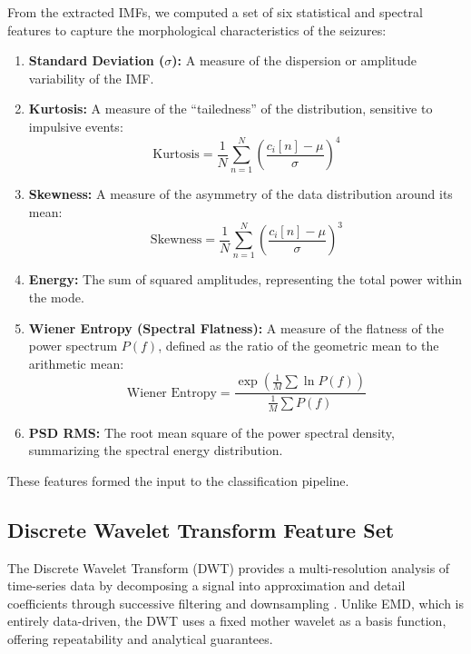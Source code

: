 \documentclass[pdflatex,sn-mathphys-num]{sn-jnl}%
\theoremstyle{thmstyleone}%
\theoremstyle{thmstyletwo}%
\theoremstyle{thmstylethree}%
\begin{document}
From the extracted IMFs, we computed a set of six statistical and spectral features to capture the morphological characteristics of the seizures:

\begin{enumerate}
    \item \textbf{Standard Deviation ($\sigma$):} A measure of the dispersion or amplitude variability of the IMF.
    \item \textbf{Kurtosis:} A measure of the ``tailedness'' of the distribution, sensitive to impulsive events:
    \begin{equation}
        \text{Kurtosis} = \frac{1}{N} \sum_{n=1}^{N} \left( \frac{c_i[n] - \mu}{\sigma} \right)^4
    \end{equation}
    \item \textbf{Skewness:} A measure of the asymmetry of the data distribution around its mean:
    \begin{equation}
        \text{Skewness} = \frac{1}{N} \sum_{n=1}^{N} \left( \frac{c_i[n] - \mu}{\sigma} \right)^3
    \end{equation}
    \item \textbf{Energy:} The sum of squared amplitudes, representing the total power within the mode.
    \item \textbf{Wiener Entropy (Spectral Flatness):} A measure of the flatness of the power spectrum $P(f)$, defined as the ratio of the geometric mean to the arithmetic mean:
    \begin{equation}
        \text{Wiener Entropy} = \frac{\exp\left(\frac{1}{M} \sum \ln P(f)\right)}{\frac{1}{M} \sum P(f)}
    \end{equation}
    \item \textbf{PSD RMS:} The root mean square of the power spectral density, summarizing the spectral energy distribution.
\end{enumerate}

These features formed the input to the classification pipeline.

\subsection{Discrete Wavelet Transform Feature Set}\label{subsec:dwt}

The Discrete Wavelet Transform (DWT) provides a multi-resolution analysis of time-series data by decomposing a signal into approximation and detail coefficients through successive filtering and downsampling \cite{daubechies1992}. Unlike EMD, which is entirely data-driven, the DWT uses a fixed mother wavelet as a basis function, offering repeatability and analytical guarantees.
\end{document}
